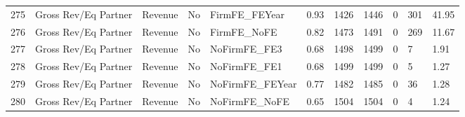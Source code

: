 \documentclass{article}
\begin{document}
\begin{table}[H]
\begin{tabular}{rllllllllll}
  275 & Gross Rev/Eq Partner & Revenue & No & FirmFE\_FEYear & 0.93 & 1426 & 1446 & 0 & 301 & 41.95 \\ 
  276 & Gross Rev/Eq Partner & Revenue & No & FirmFE\_NoFE & 0.82 & 1473 & 1491 & 0 & 269 & 11.67 \\ 
  277 & Gross Rev/Eq Partner & Revenue & No & NoFirmFE\_FE3 & 0.68 & 1498 & 1499 & 0 & 7 & 1.91 \\ 
  278 & Gross Rev/Eq Partner & Revenue & No & NoFirmFE\_FE1 & 0.68 & 1499 & 1499 & 0 & 5 & 1.27 \\ 
  279 & Gross Rev/Eq Partner & Revenue & No & NoFirmFE\_FEYear & 0.77 & 1482 & 1485 & 0 & 36 & 1.28 \\ 
  280 & Gross Rev/Eq Partner & Revenue & No & NoFirmFE\_NoFE & 0.65 & 1504 & 1504 & 0 & 4 & 1.24 \\ 
   \hline
\end{tabular}
\end{table}
\end{document}
